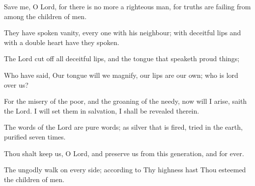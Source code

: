 Save me, O Lord, for there is no more a righteous man, for truths are failing from among the children of men.

They have spoken vanity, every one with his neighbour; with deceitful lips and with a double heart have they spoken.

The Lord cut off all deceitful lips, and the tongue that speaketh proud things;

Who have said, Our tongue will we magnify, our lips are our own; who is lord over us?

For the misery of the poor, and the groaning of the needy, now will I arise, saith the Lord. I will set them in salvation, I shall be
revealed therein.

The words of the Lord are pure words; as silver that is fired, tried in the earth, purified seven times.

Thou shalt keep us, O Lord, and preserve us from this generation, and for ever.

The ungodly walk on every side; according to Thy highness hast Thou esteemed the children of men.

